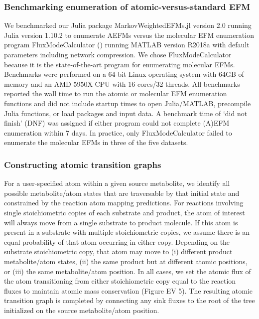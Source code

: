 \documentclass[12pt]{article}
\begin{document}
\subsubsection*{Benchmarking enumeration of atomic-versus-standard EFM}

We benchmarked our Julia package MarkovWeightedEFMs.jl version 2.0
running Julia version 1.10.2 to enumerate
AEFMs versus the molecular EFM enumeration program FluxModeCalculator
(\cite{vanKlinkenJanBert2016Faet}) running MATLAB version R2018a with
default parameters including network compression. We chose
FluxModeCalculator because it is the state-of-the-art program for
enumerating molecular EFMs. Benchmarks were performed on a 64-bit Linux
operating system with 64GB of memory and an AMD 5950X CPU with 16 cores/32
threads. All benchmarks reported the wall time to run the atomic or
molecular EFM enumeration functions and did not include startup times to
open Julia/MATLAB, precompile Julia functions, or load packages and input
data. A benchmark time of `did not finish' (DNF) was assigned if either
program could not complete (A)EFM enumeration within 7 days. In practice,
only FluxModeCalculator failed to enumerate the molecular EFMs in three of
the five datasets.

\subsubsection*{Constructing atomic transition graphs}

For a user-specified atom within a given source metabolite, we identify
all possible metabolite/atom states that are traversable by that initial
state and constrained by the reaction atom mapping predictions. For
reactions involving single stoichiometric copies of each substrate and
product, the atom of interest will always move from a single substrate to
product molecule. If this atom is present in a substrate with multiple
stoichiometric copies, we assume there is an equal probability of that
atom occurring in either copy. Depending on the substrate stoichiometric
copy, that atom may move to (i) different product metabolite/atom states,
(ii) the same product but at different atomic positions, or (iii) the same
metabolite/atom position. In all cases, we set the atomic flux of the atom
transitioning from either stoichiometric copy equal to the reaction fluxes
to maintain atomic mass conservation (Figure EV 5). The resulting atomic
transition graph is completed by connecting any sink fluxes to the root of
the tree initialized on the source metabolite/atom position. 
\end{document}
